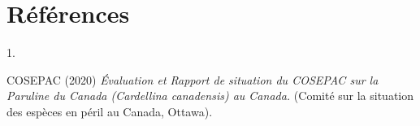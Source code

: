 \documentclass[9pt,twocolumn,twoside,]{pnas-new}
\newlength{\cslhangindent}
\newlength{\csllabelwidth}
\newlength{\cslentryspacingunit} %
\newenvironment{CSLReferences}[2] %
 {%
  \setlength{\parindent}{0pt}
  \ifodd #1
  \let\oldpar\par
  \def\par{\hangindent=\cslhangindent\oldpar}
  \fi
  \setlength{\parskip}{#2\cslentryspacingunit}
 }%
 {}
\newcommand{\CSLLeftMargin}[1]{\parbox[t]{\csllabelwidth}{#1}}
\newcommand{\CSLRightInline}[1]{\parbox[t]{\linewidth - \csllabelwidth}{#1}\break}
\begin{document}
\hypertarget{ruxe9fuxe9rences}{%
\section*{Références}\label{ruxe9fuxe9rences}}

\showmatmethods
\showacknow
\pnasbreak

\hypertarget{refs}{}
\begin{CSLReferences}{0}{0}
\leavevmode{}%
\CSLLeftMargin{1. }%
\CSLRightInline{COSEPAC (2020) \emph{Évaluation et {Rapport} de
situation du {COSEPAC} sur la {Paruline} du {Canada} ({Cardellina}
canadensis) au {Canada}.} (Comité sur la situation des espèces en péril
au Canada, Ottawa).}

\end{CSLReferences}



% 
\end{document}
